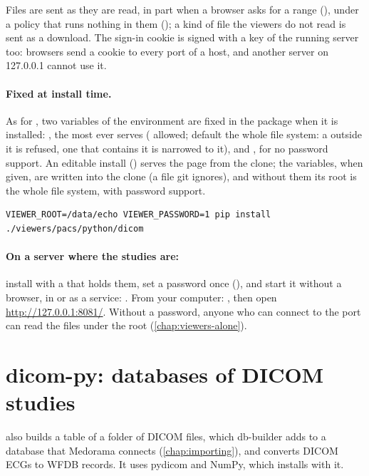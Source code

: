 Files are sent as they are read, in part when a browser asks for a range (), under a
policy that runs nothing in them (); a kind of file the
viewers do not read is sent as a download. The sign-in cookie is signed with a key of the
running server too: browsers send a cookie to every port of a host, and another server on
127.0.0.1 cannot use it.

\paragraph{Fixed at install time.} As for , two variables of the environment are
fixed in the package when it is installed: , the most  ever serves
(\code{\textasciitilde} allowed; default the whole file system: a  outside it is
refused, one that contains it is narrowed to it), and , for no password
support. An editable install () serves the page from the clone; the variables,
when given, are written into the clone (a file git ignores), and without them its root is the
whole file system, with password support.

\begin{lstlisting}[style=shell]
VIEWER_ROOT=/data/echo VIEWER_PASSWORD=1 pip install ./viewers/pacs/python/dicom
\end{lstlisting}

\paragraph{On a server where the studies are:} install with a  that holds them,
set a password once (), and start it without a browser, in
 or as a service: . From your
computer: , then open
\url{http://127.0.0.1:8081/}. Without a password, anyone who can connect to the port can read the
files under the root (\cref{chap:viewers-alone}).

\section{dicom-py: databases of DICOM studies}
\label{sec:pacs-viewer-dicom-py}

 also builds a table of a folder of DICOM files, which db-builder adds to a
database that Medorama connects (\cref{chap:importing}), and
converts DICOM ECGs to WFDB records. It uses pydicom and NumPy, which  installs with it.

